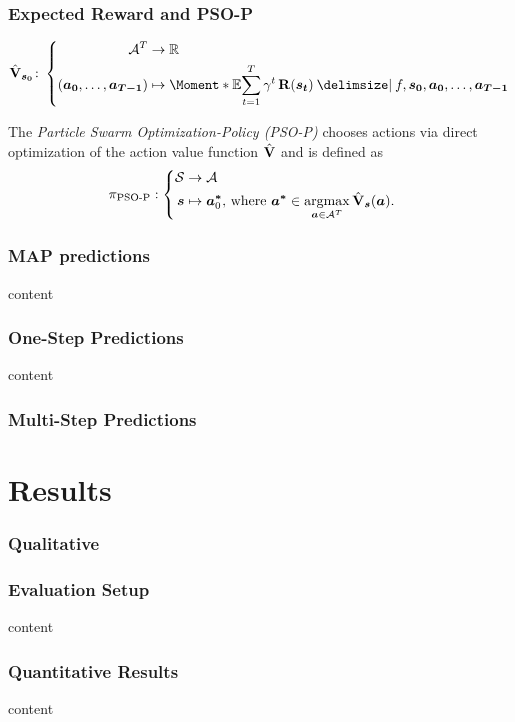\begin{frame}
    \frametitle{Expected Reward and PSO-P}

    \begin{align}
        \label{eq:action_value_function}
        \AVlu_{\mat{s_0}} \colon \left\{
            \begin{aligned}
                \Ah^T &\to \R \\
                \left( \mat{a_0}, \dots, \mat{a_{T-1}} \right) &\mapsto \Moment*{\E}{\sum_{t=1}^T \gamma^t \Rwd(\mat{s_t}) \given f, \mat{s_0}, \mat{a_0}, \dots, \mat{a_{T-1}}}
            \end{aligned}
            \right.
        \end{align}

    \begin{definition}[PSO-P]
        \label{def:psop}
        The \emph{Particle Swarm Optimization-Policy (PSO-P)} chooses actions via direct optimization of the action value function $\operatorname{\hat{\operatorname{\mathbf{V}}}}$ and is defined as
        \begin{align}
            \pi_{\text{PSO-P}} &: \left\{
            \begin{aligned}
                \mathcal{S} &\to \mathcal{A}\\
                \bm{s} &\mapsto \bm{a^\ast}_0 \text{, where } \bm{a^\ast} \in \operatorname*{argmax}_{\bm{a} \in \mathcal{A}^T} \operatorname{\hat{\operatorname{\mathbf{V}}}}_{\bm{s}}(\bm{a}).
            \end{aligned}
            \right.
        \end{align}
    \end{definition}
\end{frame}

\begin{frame}
    \frametitle{MAP predictions}

    content
\end{frame}

\begin{frame}
    \frametitle{One-Step Predictions}

    content
\end{frame}

\begin{frame}
    \frametitle{Multi-Step Predictions}

    \centering
\end{frame}

\section{Results}
\begin{frame}
    \frametitle{Qualitative}

\end{frame}

\begin{frame}
    \frametitle{Evaluation Setup}

    content
\end{frame}

\begin{frame}
    \frametitle{Quantitative Results}

    content
\end{frame}


